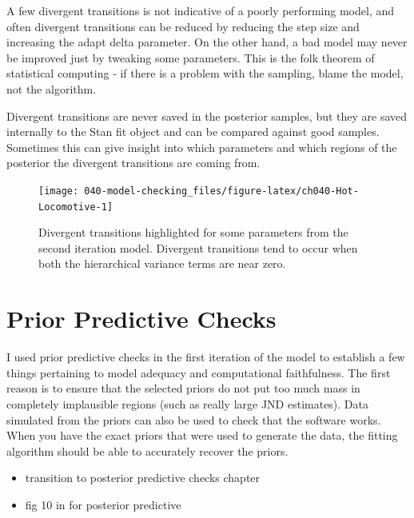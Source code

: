 \documentclass[11pt, oneside, openany]{scrbook}
\providecommand{\tightlist}{%
  \setlength{\itemsep}{0pt}\setlength{\parskip}{0pt}}
\begin{document}
A few divergent transitions is not indicative of a poorly performing model, and often divergent transitions can be reduced by reducing the step size and increasing the adapt delta parameter. On the other hand, a bad model may never be improved just by tweaking some parameters. This is the folk theorem of statistical computing - if there is a problem with the sampling, blame the model, not the algorithm.

Divergent transitions are never saved in the posterior samples, but they are saved internally to the Stan fit object and can be compared against good samples. Sometimes this can give insight into which parameters and which regions of the posterior the divergent transitions are coming from.

\begin{figure}

{\centering \texttt{[image: 040-model-checking\_files/figure-latex/ch040-Hot-Locomotive-1]} 

}

\caption{Divergent transitions highlighted for some parameters from the second iteration model. Divergent transitions tend to occur when both the hierarchical variance terms are near zero.}\label{fig:ch040-Hot-Locomotive}
\end{figure}

\hypertarget{prior-predictive-checks}{%
\section{Prior Predictive Checks}\label{prior-predictive-checks}}

I used prior predictive checks in the first iteration of the model to establish a few things pertaining to model adequacy and computational faithfulness. The first reason is to ensure that the selected priors do not put too much mass in completely implausible regions (such as really large JND estimates). Data simulated from the priors can also be used to check that the software works. When you have the exact priors that were used to generate the data, the fitting algorithm should be able to accurately recover the priors.

\begin{itemize}
\tightlist
\item
  transition to posterior predictive checks chapter
\item
  fig 10 in for posterior predictive \citet{gabry2019visualization}
\end{itemize}
\end{document}
